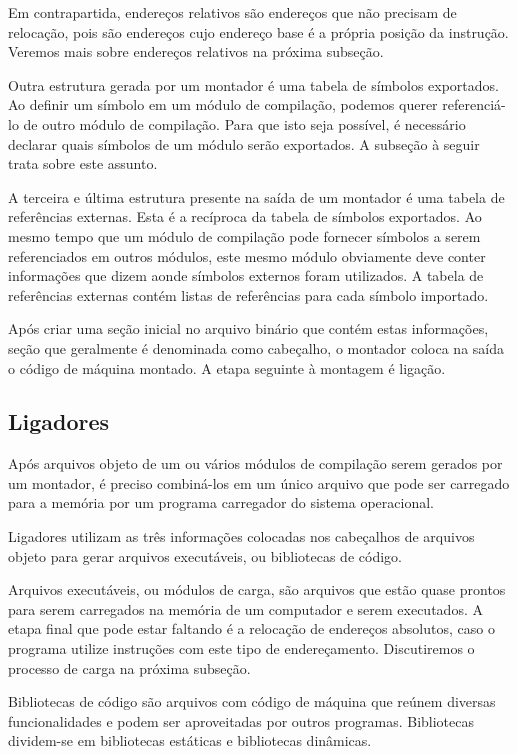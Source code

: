 Em contrapartida, endereços relativos são endereços que não precisam de relocação, pois são endereços cujo endereço base é a própria posição da instrução. Veremos mais sobre endereços relativos na próxima subseção.

Outra estrutura gerada por um montador é uma tabela de símbolos exportados. Ao definir um símbolo em um módulo de compilação, podemos querer referenciá-lo de outro módulo de compilação. Para que isto seja possível, é necessário declarar quais símbolos de um módulo serão exportados. A subseção à seguir trata sobre este assunto.

A terceira e última estrutura presente na saída de um montador é uma tabela de referências externas. Esta é a recíproca da tabela de símbolos exportados. Ao mesmo tempo que um módulo de compilação pode fornecer símbolos a serem referenciados em outros módulos, este mesmo módulo obviamente deve conter informações que dizem aonde símbolos externos foram utilizados. A tabela de referências externas contém listas de referências para cada símbolo importado.

Após criar uma seção inicial no arquivo binário que contém estas informações, seção que geralmente é denominada como cabeçalho, o montador coloca na saída o código de máquina montado. A etapa seguinte à montagem é ligação.

\subsection{Ligadores}

Após arquivos objeto de um ou vários módulos de compilação serem gerados por um montador, é preciso combiná-los em um único arquivo que pode ser carregado para a memória por um programa carregador do sistema operacional.

Ligadores utilizam as três informações colocadas nos cabeçalhos de arquivos objeto para gerar arquivos executáveis, ou bibliotecas de código.

Arquivos executáveis, ou módulos de carga, são arquivos que estão quase prontos para serem carregados na memória de um computador e serem executados. A etapa final que pode estar faltando é a relocação de endereços absolutos, caso o programa utilize instruções com este tipo de endereçamento. Discutiremos o processo de carga na próxima subseção.

Bibliotecas de código são arquivos com código de máquina que reúnem diversas funcionalidades e podem ser aproveitadas por outros programas. Bibliotecas dividem-se em bibliotecas estáticas e bibliotecas dinâmicas.

